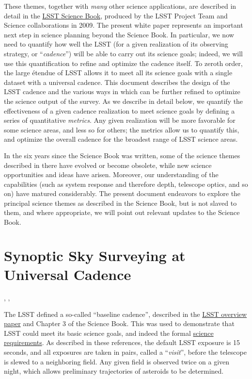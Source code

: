 These themes, together with {\em many} other science applications, are
described in detail in the
\href{http://lsst.org/scientists/scibook}{LSST Science Book}, produced
by the LSST Project Team and Science collaborations in 2009.  The
present white paper represents an important next step in science
planning beyond the Science Book.  In particular, we now need to
quantify how well the LSST (for a given realization of its observing
strategy, or ``{\em cadence}'') will be able to carry out its science
goals; indeed, we will use this quantification to refine and optimize
the cadence itself.  To zeroth order, the large \'etendue of LSST
allows it to meet all its science goals with a single dataset with a
universal cadence.  This document describes the design of the LSST
cadence and the various ways in which can be further refined to
optimize the science output of the survey.  As we describe in detail
below, we quantify the effectiveness of a given cadence realization to
meet science goals by defining a series of quantitative {\em metrics}.
Any given realization will be more favorable for some science areas,
and less so for others; the metrics allow us to quantify this, and
optimize the overall cadence for the broadest range of LSST science
areas.

In the six years since the Science Book was written, some of the
science themes described in there have evolved or become obsolete,
while new science opportunities and ideas have arisen.  Moreover, our
understanding of the capabilities (such as system response and
therefore depth, telescope optics, and so on) have matured
considerably.  The present document endeavors to explore the principal
science themes as described in the Science Book, but is not slaved to
them, and where appropriate, we will point out relevant updates to the
Science Book.




\section{Synoptic Sky Surveying at Universal Cadence}
\def\secname{intro:baseline}\label{sec:\secname}

,
,


The LSST defined a so-called ``baseline cadence'', described in the
\href{http://adsabs.harvard.edu/abs/2008arXiv0805.2366I}{LSST overview
paper} and Chapter 3 of the Science Book.  This was used
to demonstrate that LSST could meet its basic science goals, and indeed
the formal
\href{https://www.lsstcorp.org/docushare/dsweb/Get/LPM-17}{science
requirements}.    As described in these references, the default LSST
exposure is 15 seconds, and all exposures are taken in pairs, called a
``{\em visit}'', before the telescope is slewed to a neighboring field.
Any given field is observed twice on a given night, which allows
preliminary trajectories of asteroids to be determined.

